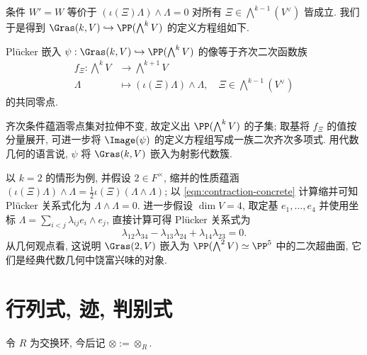 条件 $W'=W$ 等价于 $(\iota(\Xi)\Lambda) \wedge \Lambda = 0$ 对所有 $\Xi \in \bigwedge^{k-1} (V^\vee)$ 皆成立. 我们于是得到 $\Gras(k,V) \hookrightarrow \PP(\bigwedge^k V)$ 的定义方程组如下.
\begin{theorem}
	Plücker 嵌入 $\psi: \Gras(k,V) \hookrightarrow \PP(\bigwedge^k V)$ 的像等于齐次二次函数族
	\begin{align*}
		f_\Xi: \bigwedge^k V & \longrightarrow \bigwedge^{k+1} V \\
		\Lambda & \longmapsto (\iota(\Xi)\Lambda) \wedge \Lambda, \quad \Xi \in \bigwedge^{k-1} (V^\vee)
	\end{align*}
	的共同零点.
\end{theorem}
齐次条件蕴涵零点集对拉伸不变, 故定义出 $\PP(\bigwedge^k V)$ 的子集; 取基将 $f_\Xi$ 的值按分量展开, 可进一步将 $\Image(\psi)$ 的定义方程组写成一族二次齐次多项式. 用代数几何的语言说, $\psi$ 将 $\Gras(k,V)$ 嵌入为射影代数簇.

以 $k=2$ 的情形为例, 并假设 $2 \in F^\times$, 缩并的性质蕴涵 $(\iota(\Xi) \Lambda) \wedge \Lambda = \frac{1}{2} \iota(\Xi)(\Lambda \wedge \Lambda)$; 以 \eqref{eqn:contraction-concrete} 计算缩并可知 Plücker 关系式化为 $\Lambda \wedge \Lambda = 0$. 进一步假设 $\dim V = 4$, 取定基 $e_1, \ldots, e_4$ 并使用坐标 $\Lambda = \sum_{i < j} \lambda_{ij} e_i \wedge e_j$, 直接计算可得 Plücker 关系式为
\[ \lambda_{12}\lambda_{34} - \lambda_{13}\lambda_{24} + \lambda_{14}\lambda_{23} = 0. \]
从几何观点看, 这说明 $\Gras(2, V)$ 嵌入为 $\PP(\bigwedge^2 V) \simeq \PP^5$ 中的二次超曲面, 它们是经典代数几何中饶富兴味的对象.

\section{行列式, 迹, 判别式}\label{sec:trace-norm-disc}
令 $R$ 为交换环, 今后记 $\otimes := \otimes_R$.


